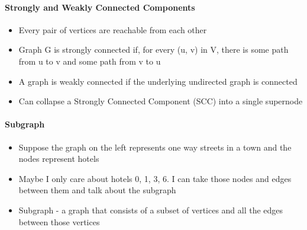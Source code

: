 \documentclass[10pt]{article}
\begin{document}
\paragraph{Strongly and Weakly Connected Components}
\begin{itemize}
    \item  Every pair of vertices are reachable from each other
    \item Graph G is strongly connected if, for every (u, v) in V, there is some path from u to v and some path from v to u
    \item A graph is weakly connected if the underlying undirected graph is connected
    \item Can collapse a Strongly Connected Component (SCC) into a single supernode
\end{itemize}
\paragraph{Subgraph}
\begin{itemize}
    \item Suppose the graph on the left represents one way streets in a town and the nodes represent hotels
    \item Maybe I only care about hotels 0, 1, 3, 6. I can take those nodes and edges between them and talk about the subgraph
    \item Subgraph - a graph that consists of a subset of vertices and all the edges between those vertices
\end{itemize}
\end{document}

